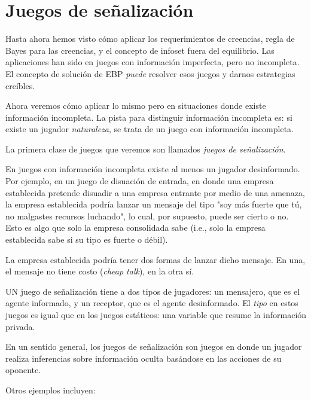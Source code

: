 \documentclass[12pt]{article}
\begin{document}
\section{Juegos de señalización}

Hasta ahora hemos visto cómo aplicar los requerimientos de creencias, regla de Bayes para las creencias, y el concepto de infoset fuera del equilibrio. Las aplicaciones han sido en juegos con información imperfecta, pero no incompleta. El concepto de solución de EBP \textit{puede} resolver esos juegos y darnos estrategias creíbles.

Ahora veremos cómo aplicar lo mismo pero en situaciones donde existe información incompleta. La pista para distinguir información incompleta es: si existe un jugador \textit{naturaleza}, se trata de un juego con información incompleta.

La primera clase de juegos que veremos son llamados \textit{juegos de señalización}.

En juegos con información incompleta existe al menos un jugador desinformado. Por ejemplo, en un juego de disuación de entrada, en donde una empresa establecida pretende disuadir a una empresa entrante por medio de una amenaza, la empresa establecida podría lanzar un mensaje del tipo "soy más fuerte que tú, no malgastes recursos luchando", lo cual, por supuesto, puede ser cierto o no. Esto es algo que solo la empresa consolidada sabe (i.e., solo la empresa establecida sabe si su tipo es fuerte o débil).

La empresa establecida podría tener dos formas de lanzar dicho mensaje. En una, el mensaje no tiene costo (\textit{cheap talk}), en la otra sí.

UN juego de señalización tiene a dos tipos de jugadores: un mensajero, que es el agente informado, y un receptor, que es el agente desinformado. El \textit{tipo} en estos juegos es igual que en los juegos estáticos: una variable que resume la información privada.

En un sentido general, los juegos de señalización son juegos en donde un jugador realiza inferencias sobre información oculta basándose en las acciones de su oponente.

Otros ejemplos incluyen:
\end{document}
